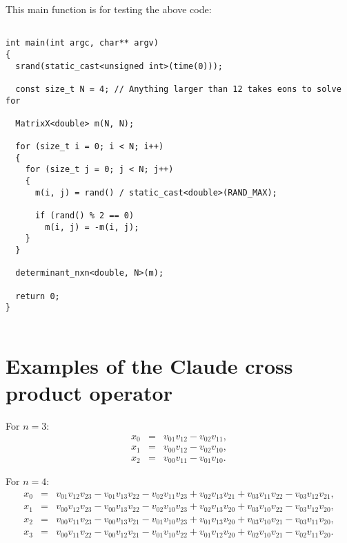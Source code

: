 \documentclass[12pt]{article}
\begin{document}
This main function is for testing the above code:
\begin{lstlisting}

int main(int argc, char** argv)
{
  srand(static_cast<unsigned int>(time(0)));

  const size_t N = 4; // Anything larger than 12 takes eons to solve for

  MatrixX<double> m(N, N);

  for (size_t i = 0; i < N; i++)
  {
    for (size_t j = 0; j < N; j++)
    {
      m(i, j) = rand() / static_cast<double>(RAND_MAX);

      if (rand() % 2 == 0)
        m(i, j) = -m(i, j);
    }
  }

  determinant_nxn<double, N>(m);

  return 0;
}


\end{lstlisting}



\section{Examples of the Claude cross product operator}

For $n = 3$:
\begin{eqnarray}
x_{0} &=& v_{01} v_{12} - v_{02} v_{11},\\
x_{1} &=& v_{00} v_{12} - v_{02} v_{10},\\
x_{2} &=& v_{00} v_{11} - v_{01} v_{10}.
\end{eqnarray}

For $n = 4$:
\begin{eqnarray}
x_{0} &=& 
   v_{01} v_{12} v_{23}
 - v_{01} v_{13} v_{22}
 - v_{02} v_{11} v_{23}
 + v_{02} v_{13} v_{21}
 + v_{03} v_{11} v_{22}
 - v_{03} v_{12} v_{21},\\
x_{1} &=& 
    v_{00} v_{12} v_{23}
  - v_{00} v_{13} v_{22}
 - v_{02} v_{10} v_{23}
 + v_{02} v_{13} v_{20}
  + v_{03} v_{10} v_{22}
  - v_{03} v_{12} v_{20},\\
x_{2} &=& 
v_{00} v_{11} v_{23}
- v_{00} v_{13} v_{21}
  - v_{01} v_{10} v_{23}
  + v_{01} v_{13} v_{20}
  + v_{03} v_{10} v_{21}
  - v_{03} v_{11} v_{20},\\
x_{3} &=& 
   v_{00} v_{11} v_{22}
 - v_{00} v_{12} v_{21}
 - v_{01} v_{10} v_{22}
 + v_{01} v_{12} v_{20}
 + v_{02} v_{10} v_{21}
 - v_{02} v_{11} v_{20}.
\end{eqnarray}










\end{document}
